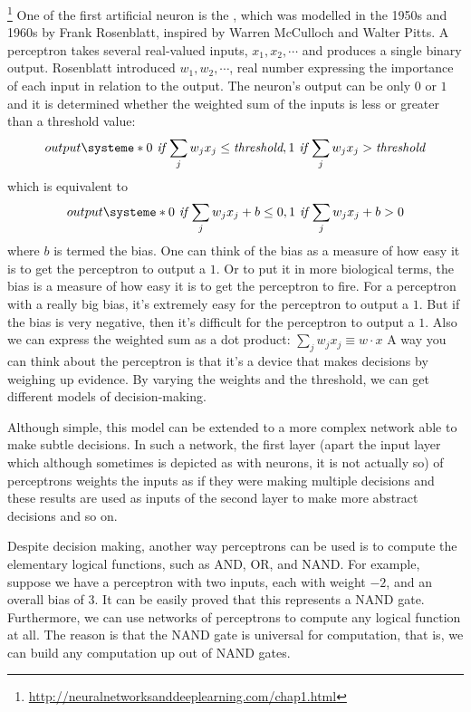 \footnote{\url{http://neuralnetworksanddeeplearning.com/chap1.html}} One of the first artificial neuron is the , which was modelled in the 1950s and 1960s by Frank Rosenblatt, inspired by Warren McCulloch and Walter Pitts. A perceptron takes several real-valued inputs, $x_1, x_2,\cdots$ and produces a single binary output. Rosenblatt introduced  $w_1, w_2, \cdots$, real number expressing the importance of each input in relation to the output. The neuron's output can be only $0$ or $1$ and it is determined whether the weighted sum of the inputs is less or greater than a threshold value:
\begin{equation}
output \systeme*{0 \textit{ if } {\sum_j w_j x_j \le \ti{threshold}} ,1 \textit{ if } {\sum_j w_j x_j> \ti{threshold}}}
\end{equation}
which is equivalent to 
\begin{equation}
output \systeme*{0 \textit{ if } {\sum_j w_j x_j+b \le 0} ,1 \ti{ if } {\sum_j w_j x_j +b> 0}}
\label{eq:PerceptronInequalities}
\end{equation}
where $b$ is termed the bias. One can think of the bias as a measure of how easy it is to get the perceptron to output a $1$. Or to put it in more biological terms, the bias is a measure of how easy it is to get the perceptron to fire. For a perceptron with a really big bias, it's extremely easy for the perceptron to output a $1$. But if the bias is very negative, then it's difficult for the perceptron to output a $1$.
Also we can express the weighted sum as a dot product: $\sum_j w_j x_j \equiv w \cdot x$
A way you can think about the perceptron is that it's a device that makes decisions by weighing up evidence. By varying the weights and the threshold, we can get different models of decision-making. 

Although simple, this model can be extended to a more complex network able to make subtle decisions. In such a network, the first layer (apart the input layer which although sometimes is depicted as with neurons, it is not actually so) of perceptrons weights the inputs as if they were making multiple decisions and these results are used as inputs of the second layer to make more abstract decisions and so on.

Despite decision making, another way perceptrons can be used is to compute the elementary logical functions, such as AND, OR, and NAND. For example, suppose we have a perceptron with two inputs, each with weight $-2$, and an overall bias of $3$. It can be easily proved that this represents a NAND gate. Furthermore, we can use networks of perceptrons to compute any logical function at all. The reason is that the NAND gate is universal for computation, that is, we can build any computation up out of NAND gates.

